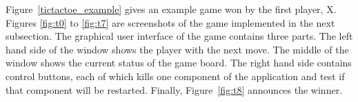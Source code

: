Figure~\ref{tictactoe_example} gives an example game won by the first player, 
X.  Figures \ref{fig:t0} to \ref{fig:t7}  are screenshots 
of the game implemented in the next subsection.  The graphical user interface 
of the game contains three parts.  The left hand side of the window shows the 
player with the next move.  The middle of the window shows the current status of 
the game board.  The right hand side contains control buttons, each of which 
kills one component of the application and test if that component will be 
restarted.  Finally, Figure~\ref{fig:t8} announces the winner.

\begin{figure}[p]
     \begin{center}
        \\
\end{center}
\end{figure}
